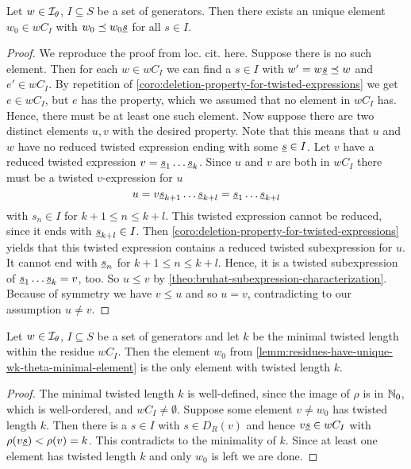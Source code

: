 \begin{lemm}
	Let $w \in \mathcal{I}_{\theta}$, $I \subseteq S$ be a set of generators. Then there exists an unique element $w_0 \in wC_I$ with $w_0 \preceq w_0 \underline{s}$ for all $s \in I$.

	\begin{proof}
		We reproduce the proof from loc. cit. here. Suppose there is no such element. Then for each $w \in wC_I$ we can find a $s \in I$ with $w' = w \underline{s} \preceq w$ and $e' \in wC_I$. By repetition of \ref{coro:deletion-property-for-twisted-expressions} we get $e \in wC_I$, but $e$ has the property, which we assumed that no element in $wC_I$ has. Hence, there must be at least one such element. Now suppose there are two distinct elements $u,v$ with the desired property. Note that this means that $u$ and $w$ have no reduced twisted expression ending with some $\underline{s} \in I$. Let $v$ have a reduced twisted expression $v = \underline{s}_1 \ldots \underline{s}_k$. Since $u$ and $v$ are both in $wC_I$ there must be a twisted $v$-expression for $u$
		$$ u = v \underline{s}_{k+1} \ldots \underline{s}_{k+l} = \underline{s}_1 \ldots \underline{s}_{k+l} $$
		with $s_n \in I$ for $k+1 \leq n \leq k+l$. This twisted expression cannot be reduced, since it ends with $\underline{s}_{k+l} \in I$. Then \ref{coro:deletion-property-for-twisted-expressions} yields that this twisted expression contains a reduced twisted subexpression for $u$. It cannot end with $\underline{s}_n$ for $k+1 \leq n \leq k+l$. Hence, it is a twisted subexpression of $\underline{s}_1 \ldots \underline{s}_k = v$, too. So $u \leq v$ by \ref{theo:bruhat-subexpression-characterization}. Because of symmetry we have $v \leq u$ and so $u = v$, contradicting to our assumption $u \neq v$.
	\end{proof}
\end{lemm}

\begin{coro}
	Let $w \in \mathcal{I}_{\theta}$, $I \subseteq S$ be a set of generators and let $k$ be the minimal twisted length within the residue $wC_I$. Then the element $w_0$ from \ref{lemm:residues-have-unique-wk-theta-minimal-element} is the only element with twisted length $k$.

	\begin{proof}
		The minimal twisted length $k$ is well-defined, since the image of $\rho$ is in $\mathbb{N}_0$, which is well-ordered, and $wC_I \neq \emptyset$. Suppose some element $v \neq w_0$ has twisted length $k$. Then there is a $s \in I$ with $s \in D_R(v)$ and hence $v \underline{s} \in wC_I$ with $\rho(v \underline{s}) < \rho(v) = k$. This contradicts to the minimality of $k$. Since at least one element has twisted length $k$ and only $w_0$ is left we are done.
	\end{proof}
\end{coro}

